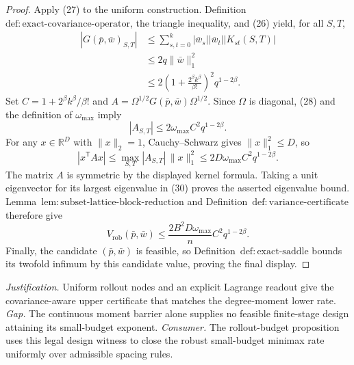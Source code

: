 \documentclass{article}
\begin{document}
\begin{proof}
Apply (27) to the uniform construction.  Definition~\(\mathrm{def{:}exact\text{-}covariance\text{-}operator}\), the triangle inequality, and (26) yield, for all \(S,T\),
\[
\begin{aligned}
|G(\bar p,\bar w)_{S,T}|
&\le\sum_{s,t=0}^k|\bar w_s||\bar w_t||K_{st}(S,T)|\\
&\le2q\|\bar w\|_1^2\\
&\le2\left(1+\frac{2^\beta k^\beta}{\beta!}\right)^2q^{1-2\beta}.
\end{aligned}
\tag{28}
\]
Set \(C=1+2^\beta k^\beta/\beta!\) and \(A=\Omega^{1/2}G(\bar p,\bar w)\Omega^{1/2}\).  Since \(\Omega\) is diagonal, (28) and the definition of \(\omega_{\max}\) imply
\[
|A_{S,T}|\le2\omega_{\max}C^2q^{1-2\beta}.
\tag{29}
\]
For any \(x\in\mathbb R^D\) with \(\|x\|_2=1\), Cauchy--Schwarz gives \(\|x\|_1^2\le D\), so
\[
|x^{\mathsf T}Ax|
\le\max_{S,T}|A_{S,T}|\,\|x\|_1^2
\le2D\omega_{\max}C^2q^{1-2\beta}.
\tag{30}
\]
The matrix \(A\) is symmetric by the displayed kernel formula.  Taking a unit eigenvector for its largest eigenvalue in (30) proves the asserted eigenvalue bound.  Lemma~\(\mathrm{lem{:}subset\text{-}lattice\text{-}block\text{-}reduction}\) and Definition~\(\mathrm{def{:}variance\text{-}certificate}\) therefore give
\[
V_{\mathrm{rob}}(\bar p,\bar w)
\le\frac{2B^2D\omega_{\max}}{n}C^2q^{1-2\beta}.
\]
Finally, the candidate \((\bar p,\bar w)\) is feasible, so Definition~\(\mathrm{def{:}exact\text{-}saddle}\) bounds its twofold infimum by this candidate value, proving the final display.
\end{proof}
\par\smallskip\noindent \textit{Justification.} Uniform rollout nodes and an explicit Lagrange readout give the covariance-aware upper certificate that matches the degree-moment lower rate. \textit{Gap.} The continuous moment barrier alone supplies no feasible finite-stage design attaining its small-budget exponent. \textit{Consumer.} The rollout-budget proposition uses this legal design witness to close the robust small-budget minimax rate uniformly over admissible spacing rules.
\end{document}
